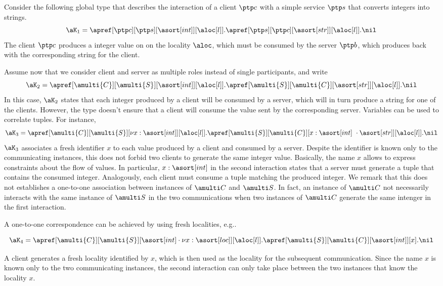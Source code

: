 \begin{example}
Consider the following global type that describes the interaction of a client $\ptp c$
with a simple service $\ptp s$ that converts integers into strings. 
\[
 \aK_1 =
    \apref[\ptp c][\ptp s][{\asort[int]}][{\aloc[l]}].    
    \apref[\ptp s][\ptp c][{\asort[str]}][{\aloc[l]}].\nil
\]
The client $\ptp c$ produces a integer value on 
on the locality $\aloc$, which must be consumed by the server $\ptp b$, which 
produces back with the corresponding string for the client. 

Assume now that we consider  client and server as 
multiple roles instead of single participants, and write
\[
 \aK_2 =
    \apref[\amulti {C}][\amulti {S}][{\asort[int]}][{\aloc[l]}].
    \apref[\amulti {S}][\amulti {C}][{\asort[str]}][{\aloc[l]}].\nil
\]
In this case, $\aK_2$ states that each integer produced by 
a client will be consumed by a server, which will in turn produce a 
string for one of the clients. However, the type doesn't ensure
that a client will consume the value sent by the corresponding server. 
Variables can be used to correlate tuples. For instance,
\[
 \aK_3 =
    \apref[\amulti {C}][\amulti {S}][{\nu x:\asort[int]}][{\aloc[l]}].
    \apref[\amulti {S}][\amulti {C}][{x : {\asort[int]} \cdot {\asort[str]} }][{\aloc[l]}].\nil
\]
$\aK_3$ associates a fresh identifier $x$ to each value produced by a 
 client and consumed by a server. Despite the identifier is  known only to 
 the communicating instances,  this does not forbid two clients to 
 generate the same integer value.  Basically, the name $x$ allows to 
 express constraints about the flow of values. In particular,  $x : \asort[int]$ 
in the second interaction states that a server must generate a tuple 
that contains the consumed integer. Analogously, each 
client must consume a tuple matching  
the produced integer. We remark that this does not establishes
a one-to-one association between instances of $\amulti C$ and $\amulti S$.
 In fact, an instance of $\amulti C$ not necessarily interacts with the 
 same instance of $\amulti S$ in the two communications when two instances of 
 $\amulti C$ generate the same intenger in the first interaction. 
 
A one-to-one correspondence can be achieved
by using  fresh localities, e.g..

\[
 \aK_4 = 
    \apref[\amulti {C}][\amulti {S}][{{\asort[int]} \cdot \nu x: {\asort[loc]}}][{\aloc[l]}].
    \apref[\amulti {S}][\amulti {C}][{{\asort[int]}}][{x}].\nil
\]

A client generates a fresh locality identified by $x$, which is then
used as the locality for the subsequent communication. Since the name 
$x$ is known only to the two communicating instances, the second 
interaction can only take place between the two instances that know the 
locality $x$.
\end{example}


